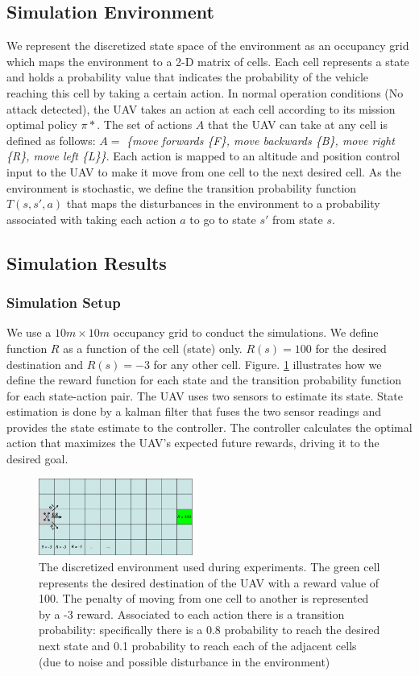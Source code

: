 \documentclass[letterpaper, 10 pt, conference]{ieeeconf}  %
\begin{document}
\subsection{Simulation Environment}
 We represent the discretized state space of the environment as an occupancy grid which maps the environment to a 2-D matrix of cells. Each cell represents a state and holds a probability value that indicates the probability of the vehicle reaching this cell by taking a certain action.
In normal operation conditions (No attack detected), the UAV takes an action at each cell according to its mission optimal policy $\pi*$. The set of actions $A$ that the UAV can take at any cell is defined as follows:
$A =$ \textit{\{move forwards \{F\}, move backwards \{B\}, move right \{R\}, move left \{L\}\}}.
Each action is mapped to an altitude and position control input to the UAV to make it move from one cell to the next desired cell. As the environment is stochastic, we define the transition probability function $T(s,s',a)$ that maps the disturbances in the environment to a probability associated with taking each action $a$ to go to state $s'$ from state $s$.
\subsection{Simulation Results}
\subsubsection{Simulation Setup}
We use a $10m\times10m$ occupancy grid to conduct the simulations. We define function $R$ as a function of the cell (state) only. $R(s) = 100$ for the desired destination and $R(s) = -3$ for any other cell. Figure. \ref{fig:sim-env} illustrates how we define the reward function for each state and the transition probability function for each state-action pair. The UAV uses two sensors to estimate its state. State estimation is done by a kalman filter that fuses the two sensor readings and provides the state estimate to the controller. The controller calculates the optimal action that maximizes the UAV's expected future rewards, driving it to the desired goal.
\begin{figure}[h]
\centering
\includegraphics[width=0.45\textwidth]{sim-env}
\caption{The discretized environment used during experiments. The green cell represents the desired destination of the UAV with a reward value of 100. The penalty of moving from one cell to another is represented by a -3 reward. Associated to each action there is a transition probability: specifically there is a 0.8 probability to reach the desired next state and 0.1 probability to reach each of the adjacent cells (due to noise and possible disturbance in the environment)}
 \label{fig:sim-env}
\end{figure}
\end{document}
